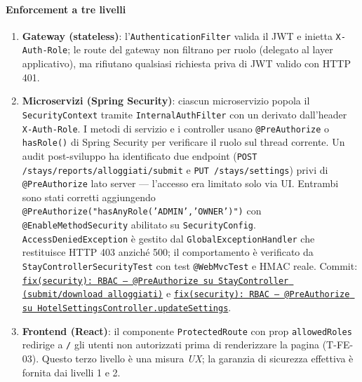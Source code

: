 ﻿\documentclass[a4paper,12pt]{report}
\newcommand{\commitref}[2]{\texttt{\small \href{https://github.com/diegoandruccioli/hotel-pms/commit/#1}{#2}}}
\begin{document}
\paragraph{Enforcement a tre livelli}

\begin{enumerate}
  \item \textbf{Gateway (stateless)}: l'\texttt{AuthenticationFilter} valida il JWT
        e inietta \texttt{X-Auth-Role}; le route del gateway non filtrano per ruolo
        (delegato al layer applicativo), ma rifiutano qualsiasi richiesta priva di JWT
        valido con HTTP 401.

  \item \textbf{Microservizi (Spring Security)}: ciascun microservizio
        popola il \texttt{SecurityContext} tramite \texttt{InternalAuthFilter}
        con un \texttt{} derivato dall'header
        \texttt{X-Auth-Role}. I metodi di servizio e i controller usano
        \texttt{@PreAuthorize} o \texttt{hasRole()} di Spring Security per
        verificare il ruolo sul thread corrente. Un audit post-sviluppo ha
        identificato due endpoint (\texttt{POST /stays/reports/alloggiati/submit}
        e \texttt{PUT /stays/settings}) privi di \texttt{@PreAuthorize}
        lato server — l'accesso era limitato solo via UI.
        Entrambi sono stati corretti aggiungendo
        \texttt{@PreAuthorize("hasAnyRole('ADMIN','OWNER')")}
        con \texttt{@EnableMethodSecurity} abilitato su \texttt{SecurityConfig}.
        \texttt{AccessDeniedException} è gestito dal \texttt{GlobalExceptionHandler}
        che restituisce HTTP 403 anziché 500; il comportamento è verificato da
        \texttt{StayControllerSecurityTest} con test \texttt{@WebMvcTest} e HMAC reale.
        Commit: \commitref{52e869c}{fix(security): RBAC --- @PreAuthorize su StayController (submit/download alloggiati)}
        e \commitref{44edf35}{fix(security): RBAC --- @PreAuthorize su HotelSettingsController.updateSettings}.

  \item \textbf{Frontend (React)}: il componente \texttt{ProtectedRoute}
        con prop \texttt{allowedRoles} redirige a \texttt{/} gli utenti
        non autorizzati prima di renderizzare la pagina (T-FE-03). Questo
        terzo livello è una misura \emph{UX}; la garanzia di sicurezza
        effettiva è fornita dai livelli 1 e 2.
\end{enumerate}

\end{document}

